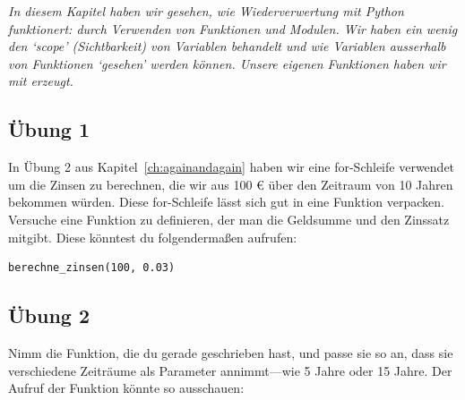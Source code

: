 \emph{In diesem Kapitel haben wir gesehen, wie Wiederverwertung mit Python funktionert: durch Verwenden von Funktionen und Modulen. Wir haben ein wenig den `scope' (Sichtbarkeit) von Variablen behandelt und wie Variablen ausserhalb von Funktionen `gesehen' werden können. Unsere eigenen Funktionen haben wir mit  erzeugt.}

\subsection*{Übung 1}
In Übung 2 aus Kapitel~\ref{ch:againandagain} haben wir eine for-Schleife verwendet um die Zinsen zu berechnen, die wir aus 100 € über den Zeitraum von 10 Jahren bekommen würden. Diese for-Schleife lässt sich gut in eine Funktion verpacken. Versuche eine Funktion zu definieren, der man die Geldsumme und den Zinssatz mitgibt. Diese könntest du folgendermaßen aufrufen:

\begin{Verbatim}[frame=single]
berechne_zinsen(100, 0.03)
\end{Verbatim}

\subsection*{Übung 2}
Nimm die Funktion, die du gerade geschrieben hast, und passe sie so an, dass sie verschiedene Zeiträume als Parameter annimmt---wie 5 Jahre oder 15 Jahre. Der Aufruf der Funktion könnte so ausschauen:

